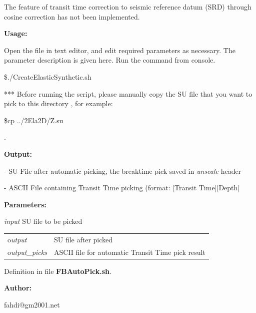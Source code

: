 \documentclass{article}
\begin{document}
\vspace{1pt}
The feature of transit time correction to seismic reference datum (SRD) through 
cosine correction has not been implemented.

\vspace{4pt}
\textbf{Usage:}

\vspace{4pt}
Open the file in text editor, and edit required parameters as necessary. The parameter 
description is given here. Run the command from console. 

\vspace{16pt}
\$./CreateElasticSynthetic.sh 

\vspace{16pt}
*** Before running the script, please manually copy the SU file that you want to 
pick to this directory , for example:

\vspace{4pt}
\$cp ../2Ela2D/Z.su 

\vspace{4pt}
.

\vspace{4pt}
\textbf{Output:}

\vspace{4pt}
- SU File after automatic picking, the breaktime pick saved in \textit{unscale 
}header

\vspace{4pt}
- ASCII File containing Transit Time picking (format: [Transit Time][Depth]

\vspace{4pt}
\textbf{Parameters:}

\vspace{4pt}
\textit{input} SU file to be picked 

\vspace{4pt}
\begin{tabular}{|>{\raggedright}p{54pt}|>{\raggedright}p{245pt}|}
\hline
\tabularnewline
\hline
o\textit{utput}  & SU file after picked \tabularnewline
\hline
o\textit{utput\_picks}  & ASCII file for automatic Transit Time pick result \tabularnewline
\hline
\end{tabular}

\vspace{1pt}
Definition in file \textbf{FBAutoPick.sh}.

\vspace{4pt}
\textbf{Author:}

\vspace{4pt}
\leftskip=18pt
fahdi@gm2001.net 
\end{document}
